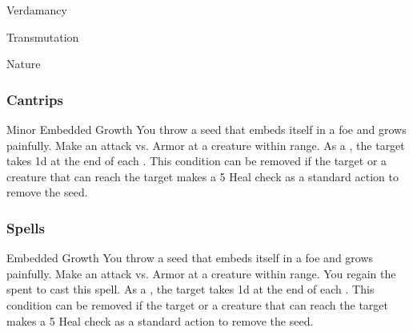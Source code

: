 \newpage
\begin{spellsection}{Verdamancy}

\begin{spellheader}
\end{spellheader}


 Transmutation

 Nature

\subsubsection{Cantrips}


\begin{freeability}{Minor Embedded Growth}
You throw a seed that embeds itself in a foe and grows painfully.
Make an attack vs. Armor at a creature within \rngclose range.
\hit As a , the target takes  \minus1d at the end of each .
This condition can be removed if the target or a creature that can reach the target makes a  5 Heal check as a standard action to remove the seed.
\end{freeability}

\end{spellsection}


\subsubsection{Spells}


\lowercase{\hypertarget{spell:Embedded Growth}{}}\label{spell:Embedded Growth}
\begin{apability}[\nth{1}]{\hypertarget{spell:Embedded Growth}{Embedded Growth}}
You throw a seed that embeds itself in a foe and grows painfully.
Make an attack vs. Armor at a creature within \rngclose range.
\miss You regain the  spent to cast this spell.
\hit As a , the target takes  \plus1d at the end of each .
This condition can be removed if the target or a creature that can reach the target makes a  5 Heal check as a standard action to remove the seed.
\end{apability}
\vspace{0.25em}



